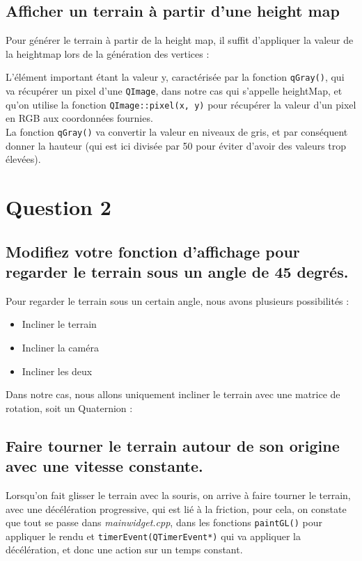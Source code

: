 \documentclass[a4paper,11pt]{report}
\begin{document}
    \subsection{Afficher un terrain à partir d'une height map}
    Pour générer le terrain à partir de la height map, il suffit d'appliquer la valeur de la heightmap lors de la génération des vertices :
        
	L'élément important étant la valeur y, caractérisée par la fonction \texttt{qGray()}, qui va récupérer un pixel d'une \texttt{QImage}, dans notre cas qui s'appelle heightMap, et qu'on utilise la fonction \texttt{QImage::pixel(x, y)} pour récupérer la valeur d'un pixel en RGB aux coordonnées fournies.\\
	La fonction \texttt{qGray()} va convertir la valeur en niveaux de gris, et par conséquent donner la hauteur (qui est ici divisée par 50 pour éviter d'avoir des valeurs trop élevées).
	 
	
	\pagebreak
	\section{Question 2}
	\subsection{Modifiez votre fonction d'affichage pour regarder le terrain sous un angle de 45 degrés.}
		Pour regarder le terrain sous un certain angle, nous avons plusieurs possibilités :
		\begin{itemize}
			\item Incliner le terrain
			\item Incliner la caméra
			\item Incliner les deux
		\end{itemize}
		
		Dans notre cas, nous allons uniquement incliner le terrain avec une matrice de rotation, soit un Quaternion :
		
		
	\subsection{Faire tourner le terrain autour de son origine avec une vitesse constante.}
		Lorsqu'on fait glisser le terrain avec la souris, on arrive à faire tourner le terrain, avec une décélération progressive, qui est lié à la friction, pour cela, on constate que tout se passe dans \textit{mainwidget.cpp}, dans les fonctions \texttt{paintGL()} pour appliquer le rendu et \texttt{timerEvent(QTimerEvent*)} qui va appliquer la décélération, et donc une action sur un temps constant.    
\end{document}
